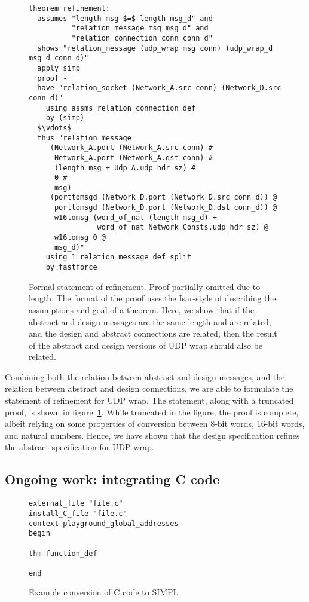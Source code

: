 \documentclass[twoside]{memoir}
\begin{document}
\begin{figure}[ht]
    \centering
\begin{lstlisting}[language=isabelle]
theorem refinement:
  assumes "length msg $=$ length msg_d" and
          "relation_message msg msg_d" and
          "relation_connection conn conn_d"
  shows "relation_message (udp_wrap msg conn) (udp_wrap_d msg_d conn_d)"
  apply simp
  proof -
  have "relation_socket (Network_A.src conn) (Network_D.src conn_d)"
    using assms relation_connection_def
    by (simp)
  $\vdots$
  thus "relation_message
     (Network_A.port (Network_A.src conn) #
      Network_A.port (Network_A.dst conn) #
      (length msg + Udp_A.udp_hdr_sz) #
      0 #
      msg)
     (porttomsgd (Network_D.port (Network_D.src conn_d)) @
      porttomsgd (Network_D.port (Network_D.dst conn_d)) @
      w16tomsg (word_of_nat (length msg_d) + 
                word_of_nat Network_Consts.udp_hdr_sz) @
      w16tomsg 0 @
      msg_d)"
    using 1 relation_message_def split
    by fastforce
\end{lstlisting}
    \caption{Formal statement of refinement. Proof partially omitted due to length.
    The format of the proof uses the Isar-style of describing the assumptions and 
    goal of a theorem.
    Here, we show that if the abstract and design messages are the same length and are related,
    and the design and abstract connections are related, then
    the result of the abstract and design versions of UDP wrap should also be related.
    }
    \label{fig:refine}
\end{figure}

Combining both the relation between abstract and design messages,
and the relation between abstract and design connections,
we are able to formulate the statement of refinement for UDP wrap.
The statement, along with a truncated proof, is shown in figure~\ref{fig:refine}.
While truncated in the figure, the proof is complete, albeit relying on some
properties of conversion between 8-bit words, 16-bit words, and natural numbers.
Hence, we have shown that the design specification refines the abstract specification for
UDP wrap.


\subsection{Ongoing work: integrating C code}

\begin{figure}[h]
    \centering
\begin{lstlisting}
external_file "file.c"
install_C_file "file.c"
context playground_global_addresses
begin

thm function_def

end
\end{lstlisting}
    \caption{Example conversion of C code to SIMPL}
    \label{fig:convert-c}
\end{figure}
\end{document}
